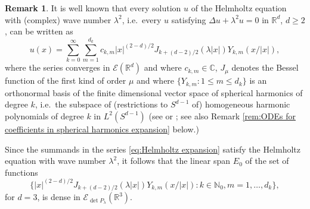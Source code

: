 \documentclass[a4paper,10pt]{amsart}
\newtheorem*{crucial lemma}{Lemma \ref{lem:nice polynomial2}}
\theoremstyle{definition}
\newtheorem{remark}[theorem]{Remark}
\newcommand{\R}{\mathbb{R}}
\newcommand{\C}{\mathbb{C}}
\newcommand{\N}{\mathbb{N}}
\newcommand{\detP}{\operatorname{det}\!P}
\begin{document}
\begin{remark}\label{rem:Bessel and spherical harmonics}
	It is well known that every solution $u$ of the Helmholtz equation with (complex) wave number $\lambda^2$, i.e.~every $u$ satisfying $\Delta u +\lambda^2u=0$ in $\R^d$, $d\geq 2$, can be written as
	\begin{equation}\label{eq:Helmholtz expansion}
		u(x)=\sum_{k=0}^\infty\sum_{m=1}^{d_k}c_{k,m}|x|^{(2-d)/2}J_{k+(d-2)/2}(\lambda|x|)Y_{k,m}(x/|x|),
	\end{equation}
	where the series converges in $\mathscr{E}(\R^d)$ and where $c_{k,m}\in\C$, $J_\mu$ denotes the Bessel function of the first kind of order $\mu$ and where $\{Y_{k,m}\colon 1\leq m\leq d_k\}$ is an orthonormal basis of the finite dimensional vector space of spherical harmonics of degree $k$, i.e.~the subspace of (restrictions to $S^{d-1}$ of) homogeneous harmonic polynomials of degree $k$ in $L^2(S^{d-1})$ (see \cite[the discussion preceding Theorem 2.2.66]{Folland1995} or \cite[Section V.5.5 and \S VII.2]{CourantHilbert1953}; see also Remark \ref{rem:ODEs for coefficients in spherical harmonics expansion} below.)

	Since the summands in the series \eqref{eq:Helmholtz expansion} satisfy the Helmholtz equation with wave number $\lambda^2$, it follows that the linear span $E_0$ of the set of functions
	\[\{|x|^{(2-d)/2}J_{k+(d-2)/2}(\lambda |x|)Y_{k,m}(x/|x|)\colon k\in\N_0, m=1,\ldots,d_k\},\]
	for $d=3$, is dense in $\mathscr{E}_{\detP_\lambda}(\R^3)$.
	

\end{remark}
\end{document}
